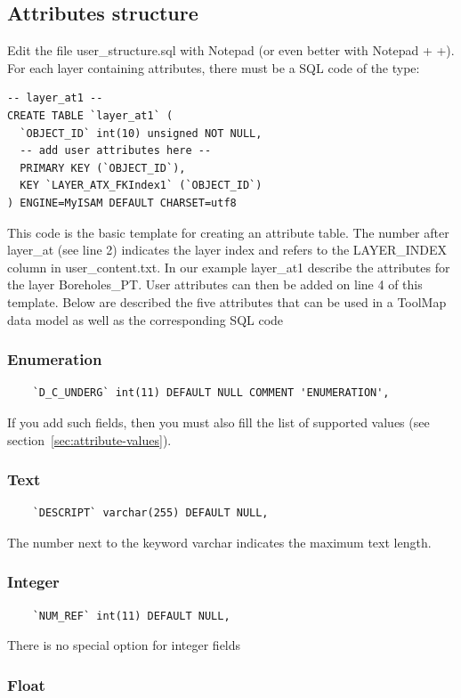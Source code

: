 \documentclass[a4paper, 12pt]{article}
\begin{document}
\subsection{Attributes structure}
Edit the file user\_structure.sql with Notepad (or even better with Notepad + +). For each layer containing attributes, there must be a SQL code of the type:

\begin{lstlisting}
-- layer_at1 --
CREATE TABLE `layer_at1` (
  `OBJECT_ID` int(10) unsigned NOT NULL,
  -- add user attributes here --
  PRIMARY KEY (`OBJECT_ID`),
  KEY `LAYER_ATX_FKIndex1` (`OBJECT_ID`)
) ENGINE=MyISAM DEFAULT CHARSET=utf8
\end{lstlisting}
This code is the basic template for creating an attribute table. The number after layer\_at (see line 2) indicates the layer index and refers to the LAYER\_INDEX column in user\_content.txt. In our example layer\_at1 describe the attributes for the layer Boreholes\_PT. User attributes can then be added on line 4 of this template.
Below are described the five attributes that can be used in a ToolMap data model as well as the corresponding SQL code
\subsubsection {Enumeration}
\label{sec:enumeration}
    \begin{lstlisting}
    `D_C_UNDERG` int(11) DEFAULT NULL COMMENT 'ENUMERATION',
    \end{lstlisting}
    If you add such fields, then you must also fill the list of supported values (see section~\ref{sec:attribute-values}).
    \subsubsection {Text}
    \begin{lstlisting}
    `DESCRIPT` varchar(255) DEFAULT NULL,
    \end{lstlisting}
    The number next to the keyword varchar indicates the maximum text length. 
    \subsubsection {Integer}
    \begin{lstlisting}
    `NUM_REF` int(11) DEFAULT NULL,       
    \end{lstlisting}
    There is no special option for integer fields
  \subsubsection {Float}
\end{document}
